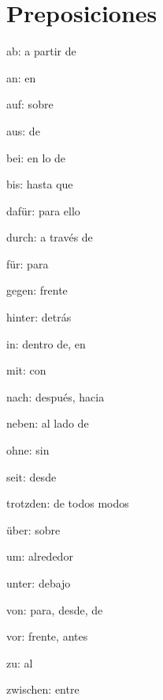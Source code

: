 \section{Preposiciones}
\begin{multicols}{3}
\begin{myitemize}
\item ab: a partir de
\item an: en
\item auf: sobre
\item aus: de
\item bei: en lo de
\item bis: hasta que
\item dafür: para ello
\item durch: a través de
\item für: para
\item gegen: frente
\item hinter: detrás
\item in: dentro de, en
\item mit: con
\item nach: después, hacia
\item neben: al lado de
\item ohne: sin
\item seit: desde
\item trotzden: de todos modos
\item über: sobre
\item um: alrededor
\item unter: debajo
\item von: para, desde, de
\item vor: frente, antes
\item zu: al
\item zwischen: entre
\end{myitemize}
\end{multicols}


